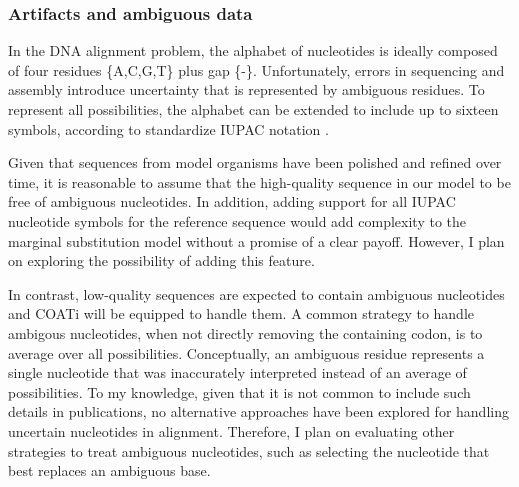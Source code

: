 
\subsubsection{Artifacts and ambiguous data}



In the DNA alignment problem, the alphabet of nucleotides is ideally composed
of four residues \{A,C,G,T\} plus gap \{-\}.
Unfortunately, errors in sequencing and assembly introduce uncertainty that is
represented by ambiguous residues.
To represent all possibilities, the alphabet can be extended to include up to
sixteen symbols, according to standardize IUPAC notation
\parencite{cornish_1985_nomenclature}.


Given that sequences from model organisms have been polished and refined over
time, it is reasonable to assume that the high-quality sequence in our model to
be free of ambiguous nucleotides.
In addition, adding support for all IUPAC nucleotide symbols for the reference
sequence would add complexity to the marginal substitution model without a
promise of a clear payoff.
However, I plan on exploring the possibility of adding this feature.

In contrast, low-quality sequences are expected to contain ambiguous nucleotides
and COATi will be equipped to handle them.
A common strategy to handle ambigous nucleotides, when not directly removing the
containing codon, is to average over all possibilities.
Conceptually, an ambiguous residue represents a single nucleotide that was
inaccurately interpreted instead of an average of possibilities.
To my knowledge, given that it is not common to include such details in
publications, no alternative approaches have been explored for handling
uncertain nucleotides in alignment.
Therefore, I plan on evaluating other strategies to treat ambiguous nucleotides,
such as selecting the nucleotide that best replaces an ambiguous base.

